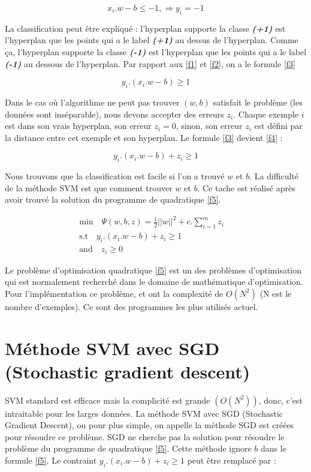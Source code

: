 \begin{equation}
x_i.w - b \leq -1, \Rightarrow y_i = -1
\label{f2}
\end{equation}

La classification peut être expliqué : l'hyperplan supporte la classe \textit{\textbf{(+1)}} est l'hyperplan que les points qui a le label \textit{\textbf{(+1)}} au dessus de l'hyperplan. Comme ça, l'hyperplan supporte la classe \textit{\textbf{(-1)}} est l'hyperplan que les points qui a le label \textit{\textbf{(-1)}} au dessous de l'hyperplan. Par rapport aux \ref{f1} et \ref{f2}, on a le formule \ref{f3}

\begin{equation}
y_i.(x_i.w - b) \geq 1
\label{f3}
\end{equation}

Dans le cas où l'algorithme ne peut pas trouver $(w, b)$ satisfait le problème (les données sont inséparable), nous devons accepter des erreurs $z_i$. Chaque exemple $i$ est dans son vrais hyperplan, son erreur $z_i = 0$, sinon, son erreur $z_i$ est défini par la distance entre cet exemple et son hyperplan. Le formule \ref{f3} devient \ref{f4} :

\begin{equation}
y_i.(x_i.w - b) + z_i \geq 1
\label{f4}
\end{equation}

Nous trouvons que la classification est facile si l'on a trouvé $w$ et $b$. La difficulté de la méthode SVM est que comment trouver $w$ et $b$. Ce tache est réalisé après avoir trouvé la solution du programme de quadratique \ref{f5}.

\begin{equation}
\begin{split}
\mbox{min}\quad \Psi(w, b, z) = \frac{1}{2} ||w||^2 + c.\sum\limits_{i=1}^m z_i\quad \\ \mbox{s.t} \quad y_i.(x_i.w - b) + z_i \geq 1 \\ \mbox{and} \quad z_i \geq 0
\end{split}
\label{f5}
\end{equation}

Le problème d'optimisation quadratique \ref{f5} est un des problèmes d'optimisation qui est normalement recherché dans le domaine de mathématique d'optimisation. Pour l'implémentation ce problème, \cite{jp98} et \cite{cl01} ont la complexité de $O(N^2)$ (N est le nombre d'exemples). Ce sont des programmes les plus utilisés actuel.

\section{Méthode SVM avec SGD (Stochastic gradient descent)}
SVM standard est efficace mais la complicité est grande $(O(N^2))$, donc, c'est intraitable pour les larges données. La méthode SVM avec SGD (Stochastic Gradient Descent), ou pour plus simple, on appelle la méthode SGD est créées pour résoudre ce problème. SGD ne cherche pas la solution pour résoudre le problème du programme de quadratique \ref{f5}. Cette méthode ignore $b$  dans le formule \ref{f5}. Le contraint $y_i.(x_i.w - b) + z_i \geq 1$ peut être remplacé par : 

